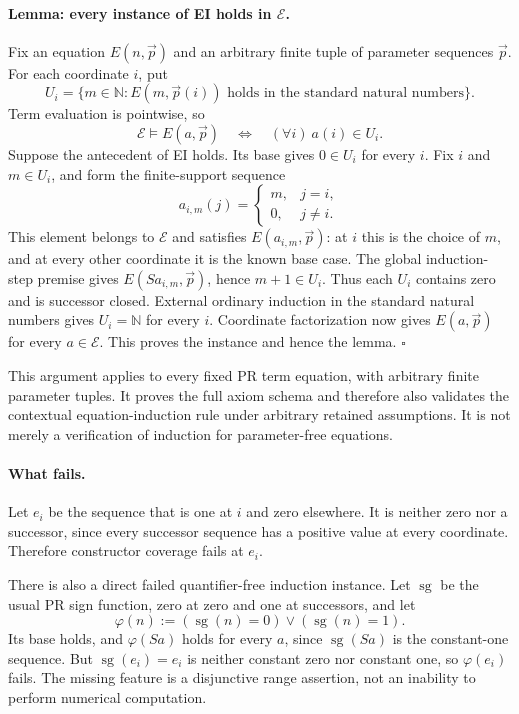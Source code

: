 \documentclass[11pt,letterpaper]{article}
\theoremstyle{definition}\newtheorem{definition}[theorem]{Definition}
\theoremstyle{remark}\newtheorem{remark}[theorem]{Remark}
\begin{document}
\paragraph{Lemma: every instance of EI holds in $\mathcal E$.}
Fix an equation $E(n,\vec p)$ and an arbitrary finite tuple of parameter
sequences $\vec p$.  For each coordinate $i$, put
\[
 U_i=\{m\in\mathbb N:
       E(m,\vec p(i))\text{ holds in the standard natural numbers}\}.
\]
Term evaluation is pointwise, so
\[
 \mathcal E\models E(a,\vec p)
 \quad\Longleftrightarrow\quad
 (\forall i)\ a(i)\in U_i.
 \tag{Coordinate factorization}
\]
Suppose the antecedent of EI holds.  Its base gives $0\in U_i$ for
every $i$.  Fix $i$ and $m\in U_i$, and form the finite-support
sequence
\[
 a_{i,m}(j)=
 \begin{cases}m,&j=i,\\0,&j\ne i.\end{cases}
\]
This element belongs to $\mathcal E$ and satisfies $E(a_{i,m},\vec p)$:
at $i$ this is the choice of $m$, and at every other coordinate it is
the known base case.  The global induction-step premise gives
$E(Sa_{i,m},\vec p)$, hence $m+1\in U_i$.  Thus each $U_i$ contains
zero and is successor closed.  External ordinary induction in the
standard natural numbers gives $U_i=\mathbb N$ for every $i$.
Coordinate factorization now gives $E(a,\vec p)$ for every
$a\in\mathcal E$.  This proves the instance and hence the lemma.
\hfill$\square$

This argument applies to every fixed PR term equation, with arbitrary
finite parameter tuples.  It proves the full axiom schema and therefore
also validates the contextual equation-induction rule under arbitrary
retained assumptions.  It is not merely a verification of induction
for parameter-free equations.

\paragraph{What fails.}
Let $e_i$ be the sequence that is one at $i$ and zero elsewhere.
It is neither zero nor a successor, since every successor sequence has
a positive value at every coordinate.  Therefore constructor coverage
fails at $e_i$.

There is also a direct failed quantifier-free induction instance.  Let
$\operatorname{sg}$ be the usual PR sign function, zero at zero and
one at successors, and let
\[
 \varphi(n):=
   (\operatorname{sg}(n)=0)\lor(\operatorname{sg}(n)=1).
\]
Its base holds, and $\varphi(Sa)$ holds for every $a$, since
$\operatorname{sg}(Sa)$ is the constant-one sequence.  But
$\operatorname{sg}(e_i)=e_i$ is neither constant zero nor constant one,
so $\varphi(e_i)$ fails.  The missing feature is a disjunctive range
assertion, not an inability to perform numerical computation.
\end{document}
